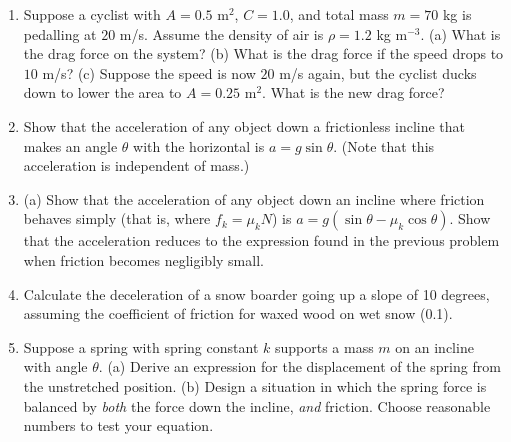 \documentclass{article}
\begin{document}
\begin{enumerate}
\item Suppose a cyclist with $A = 0.5$ m$^2$, $C = 1.0$, and total mass $m = 70$ kg is pedalling at $20$ m/s.  Assume the density of air is $\rho = 1.2$ kg m$^{-3}$.  (a) What is the drag force on the system? (b) What is the drag force if the speed drops to $10$ m/s? (c)  Suppose the speed is now $20$ m/s again, but the cyclist ducks down to lower the area to $A = 0.25$ m$^2$.  What is the new drag force? \\ \vspace{3cm}
\item Show that the acceleration of any object down a frictionless incline that makes an angle $\theta$ with the horizontal is $a=g\sin\theta$. (Note that this acceleration is independent of mass.) \\ \vspace{3cm}
\item (a) Show that the acceleration of any object down an incline where friction behaves simply (that is, where $f_k = \mu_k N$) is $a = g(\sin\theta - \mu_k\cos\theta)$.  Show that the acceleration reduces to the expression found in the previous problem when friction becomes negligibly small. \\ \vspace{3cm}
\item Calculate the deceleration of a snow boarder going up a slope of 10 degrees, assuming the coefficient of friction for waxed wood on wet snow (0.1). \\ \vspace{3cm}
\item Suppose a spring with spring constant $k$ supports a mass $m$ on an incline with angle $\theta$.  (a) Derive an expression for the displacement of the spring from the unstretched position.  (b) Design a situation in which the spring force is balanced by \textit{both} the force down the incline, \textit{and} friction.  Choose reasonable numbers to test your equation.
\end{enumerate}
\end{document}
